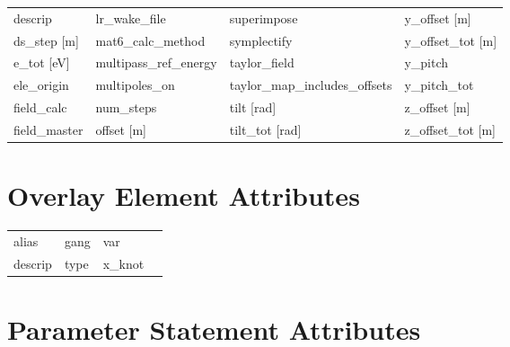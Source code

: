 \begin{tabular}{llll}
descrip                          & lr_wake_file                     & superimpose                      & y_offset [m]                     \\
ds_step [m]                      & mat6_calc_method                 & symplectify                      & y_offset_tot [m]                 \\
e_tot [eV]                       & multipass_ref_energy             & taylor_field                     & y_pitch                          \\
ele_origin                       & multipoles_on                    & taylor_map_includes_offsets      & y_pitch_tot                      \\
field_calc                       & num_steps                        & tilt [rad]                       & z_offset [m]                     \\
field_master                     & offset [m]                       & tilt_tot [rad]                   & z_offset_tot [m]                 \\
 \bottomrule
 \end{tabular}
 \vfill
 
 \section{Overlay Element Attributes}
 \label{s:list.overlay}
 
 \begin{tabular}{llll} \toprule
alias                            & gang                             & var                              &                                  \\
descrip                          & type                             & x_knot                           &                                  \\
 \bottomrule
 \end{tabular}
 \vfill
 
 \section{Parameter Statement Attributes}
 \label{s:list.parameter}
 
